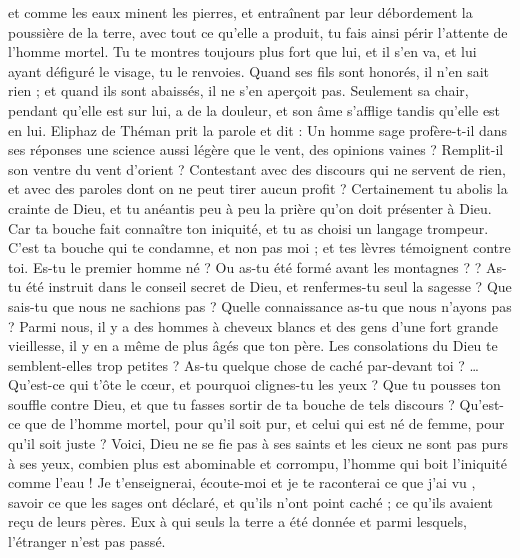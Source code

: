 \begin{multicols}{2}
 et comme les eaux minent les pierres, et entraînent par leur débordement la poussière de la terre, avec tout ce qu'elle a produit, tu fais ainsi périr l'attente de l'homme mortel.
Tu te montres toujours plus fort que lui, et il s'en va, et lui ayant défiguré le visage, tu le renvoies.
Quand ses fils sont honorés, il n'en sait rien ; et quand ils sont abaissés, il ne s'en aperçoit pas.
Seulement sa chair, pendant qu'elle est sur lui, a de la douleur, et son âme s'afflige tandis qu'elle est en lui.  
\VerseOne{}Eliphaz de Théman prit la parole et dit :
Un homme sage profère-t-il dans ses réponses une science aussi légère que le vent, des opinions vaines ? Remplit-il son ventre du vent d'orient ?
Contestant avec des discours qui ne servent de rien, et avec des paroles dont on ne peut tirer aucun profit ?
Certainement tu abolis la crainte de Dieu, et tu anéantis peu à peu la prière qu'on doit présenter à Dieu. 
 Car ta bouche fait connaître ton iniquité, et tu as choisi un langage trompeur. 
C'est ta bouche qui te condamne, et non pas moi ; et tes lèvres témoignent contre toi. 
Es-tu le premier homme né ? Ou as-tu été formé avant les montagnes ?  ?
As-tu été instruit dans le conseil secret de Dieu, et renfermes-tu seul la sagesse ?
Que sais-tu que nous ne sachions pas ? Quelle connaissance as-tu que nous n'ayons pas ?
Parmi nous, il y a des hommes à cheveux blancs et des gens d'une fort grande vieillesse, il y en a même de plus âgés que ton père. 
Les consolations du Dieu te semblent-elles trop petites ? As-tu quelque chose de caché par-devant toi ? …
Qu'est-ce qui t'ôte le cœur, et pourquoi clignes-tu les yeux ?
Que tu pousses ton souffle contre Dieu, et que tu fasses sortir de ta bouche de tels discours ? 
Qu'est-ce que de l'homme mortel, pour qu'il soit pur, et celui qui est né de femme, pour qu'il soit juste ?
Voici, Dieu ne se fie pas à ses saints et les cieux ne sont pas purs à ses yeux,
combien plus est abominable et corrompu, l'homme qui boit l'iniquité comme l'eau !  
Je t'enseignerai, écoute-moi et je te raconterai ce que j'ai vu ,
 savoir ce que les sages ont déclaré, et qu'ils n'ont point caché ; ce qu'ils avaient reçu de leurs pères.
Eux à qui seuls la terre a été donnée et parmi lesquels, l'étranger n'est pas passé.
\end{multicols}
